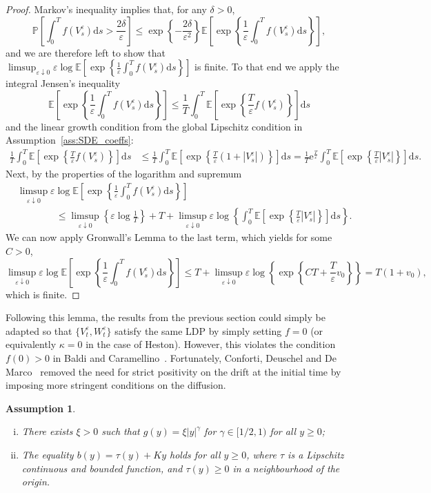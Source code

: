 \documentclass{amsart}[11pt]
\numberwithin{equation}{section}
\numberwithin{theorem}{subsection}
\numberwithin{proposition}{subsection}
\numberwithin{definition}{subsection}
\numberwithin{lemma}{subsection}
\newtheorem{assumption}{Assumption}
\numberwithin{assumption}{subsection}
\newcommand{\PP}{\mathbb{P}}
\newcommand{\EE}{\mathbb{E}}
\newcommand{\D}{\mathrm{d}}
\newcommand{\E}{\mathrm{e}}
\newcommand{\eps}{\varepsilon}
\begin{document}
\begin{proof}
Markov's inequality implies that, for any $\delta>0$,
\[
\PP\left[ \int_0^T f(V_s^\eps)\D s > \frac{2\delta}{\eps} \right] \leq \exp\left\{ -\frac{2\delta}{\eps^2}\right\}\EE\left[ \exp\left\{ \frac 1\eps \int_0^T f(V_s^\eps)\D s \right\} \right],
\]
and we are therefore left to show that 
$\limsup_{\eps\downarrow 0}\eps\log\EE\left[ \exp\left\{ \frac 1\eps \int_0^T f(V_s^\eps)\D s \right\} \right]$
is finite.
To that end we apply the integral Jensen's inequality
\[
\EE\left[ \exp\left\{ \frac 1\eps \int_0^T f(V_s^\eps)\D s \right\} \right] \leq \frac{1}{T} \int_0^T \EE\left[ \exp\left\{ \frac{T}\eps f(V_s^\eps) \right\} \right] \D s
\]
and the linear growth condition from the global Lipschitz condition in Assumption~\ref{ass:SDE_coeffs}:
\begin{align*}
\frac{1}{T} \int_0^T \EE\left[ \exp\left\{ \frac{T}\eps f(V_s^\eps) \right\} \right] \D s &\leq \frac{1}{T} \int_0^T \EE\left[ \exp\left\{ \frac{T}\eps\left(1 + |V_s^\eps| \right) \right\} \right] \D s 
= \frac{1}{T}\E^{\frac{T}{\eps}} \int_0^T \EE\left[ \exp\left\{ \frac{T}\eps |V_s^\eps| \right\} \right] \D s.
\end{align*}
Next, by the properties of the logarithm and supremum
\begin{align*}
& \limsup_{\eps\downarrow 0}\eps\log\EE\left[ \exp\left\{ \frac 1\eps \int_0^T f(V_s^\eps)\D s \right\} \right] \\ & \qquad \qquad \leq \limsup_{\eps\downarrow 0}\left\{\eps\log\frac1T\right\} + T + \limsup_{\eps\downarrow 0}\eps\log\left\{\int_0^T  \EE\left[ \exp\left\{ \frac{T}\eps |V_s^\eps| \right\} \right] \D s\right\}.
\end{align*}
We can now apply Gronwall's Lemma to the last term, which yields for some $C>0$,
\[
\limsup_{\eps\downarrow 0}\eps\log\EE\left[ \exp\left\{ \frac 1\eps \int_0^T f(V_s^\eps)\D s \right\} \right] \leq T + \limsup_{\eps\downarrow 0}\eps\log\left\{ \exp\left\{ CT + \frac{T}{\eps} v_0 \right\} \right\} = T(1+v_0),
\]
which is finite.
\end{proof}
Following this lemma, the results from the previous section could simply be adapted so that $\{V_t^\eps,W_t^{\eps}\}$ satisfy the same LDP by simply setting $f=0$ (or equivalently $\kappa = 0$ in the case of Heston). However, this violates the condition $f(0)>0$ in Baldi and Caramellino~\cite{Baldi2011}. Fortunately, Conforti, Deuschel and De Marco~\cite{conforti2015small} removed the need for strict positivity on the drift at the initial time by imposing more stringent conditions on the diffusion.
\begin{assumption}\label{ass:small_time_LDP}\
\begin{enumerate}[i)]
	\item There exists $\xi>0$ such that  $g(y)=\xi |y|^\gamma$ for $\gamma \in[1 / 2,1)$ for all $y\geq0$;
	\item The equality $b(y)=\tau(y)+ K y$ holds for all $y\geq0$, where $\tau$ is a Lipschitz continuous and bounded function, and $\tau(y) \geq 0$ in a neighbourhood of the origin.
\end{enumerate}
\end{assumption}
\end{document}
